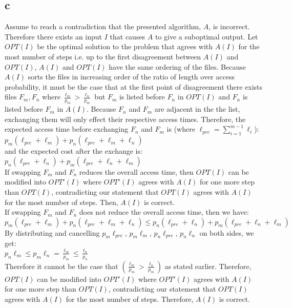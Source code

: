 \documentclass[letterpaper,notitlepage,twoside]{article}
\newcommand\tab[1][1cm]{\hspace*{#1}} %
\begin{document}
\subsection*{c}
Assume to reach a contradiction that the presented algorithm, $A$, is incorrect. Therefore there exists an input $I$ that causes $A$ to give a suboptimal output. Let $OPT(I)$ be the optimal solution to the problem that agrees with $A(I)$ for the most number of steps i.e. up to the first disagreement between $A(I)$ and $OPT(I)$, $A(I)$ and $OPT(I)$ have the same ordering of the files. Because $A(I)$ sorts the files in increasing order of the ratio of length over access probability, it must be the case that at the first point of disagreement there exists files $F_m, F_n$ where $\frac{\ell_m}{p_m} > \frac{\ell_n}{p_m}$ but $F_m$ is listed before $F_n$ in $OPT(I)$ and $F_n$ is listed before $F_m$ in $A(I)$. Because $F_n$ and $F_m$ are adjacent in the the list, exchanging them will only effect their respective access times. Therefore, the expected access time before exchanging $F_n$ and $F_m$ is (where $\ell_{pre} = \sum_{i=1}^{m-1} \ell_i$):\\
\tab$p_m(\ell_{pre}+\ell_m)+p_n(\ell_{pre}+\ell_m+\ell_n)$\\
and the expected cost after the exchange is:\\
\tab$p_n(\ell_{pre}+\ell_n)+p_m(\ell_{pre}+\ell_n+\ell_m)$\\
If swapping $F_m$ and $F_n$ reduces the overall access time, then $OPT(I)$ can be modified into $OPT'(I)$ where $OPT'(I)$ agrees with $A(I)$ for one more step than $OPT(I)$, contradicting our statement that $OPT(I)$ agrees with $A(I)$ for the most number of steps. Then, $A(I)$ is correct. \\
If swapping $F_m$ and $F_n$ does not reduce the overall access time, then we have: \\
\tab$p_m(\ell_{pre}+\ell_m)+p_n(\ell_{pre}+\ell_m+\ell_n) \leq p_n(\ell_{pre}+\ell_n)+p_m(\ell_{pre}+\ell_n+\ell_m)$ \\
By distributing and cancelling $p_m\ell_{pre}$, $p_m\ell_m$, $p_n\ell_{pre}$, $p_n\ell_n$ on both sides, we get:\\
$p_n\ell_m \leq p_m\ell_n = \frac{\ell_m}{p_m} \leq \frac{\ell_n}{p_n}$\\
Therefore it cannot be the case that $(\frac{\ell_m}{p_m} > \frac{\ell_n}{p_m})$ as stated earlier. Therefore, $OPT(I)$ can be modified into $OPT'(I)$ where $OPT'(I)$ agrees with $A(I)$ for one more step than $OPT(I)$, contradicting our statement that $OPT(I)$ agrees with $A(I)$ for the most number of steps. Therefore, $A(I)$ is correct.
\end{document}
